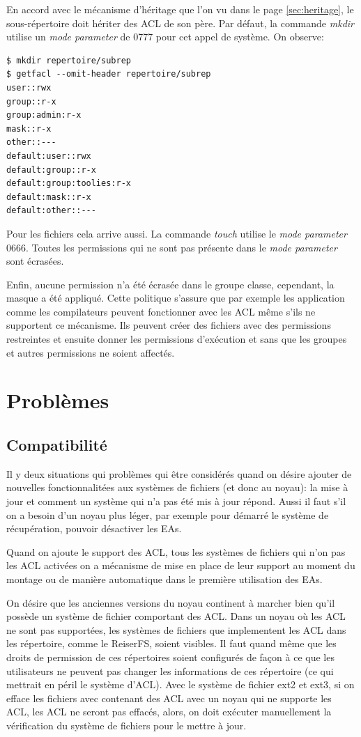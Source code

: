 En accord avec le mécanisme d'héritage que l'on vu dans le page \ref{sec:heritage}, le sous-répertoire doit hériter des ACL de son père. Par défaut, la commande \emph{mkdir} utilise un \emph{mode parameter} de 0777 pour cet appel de système. On observe:

\begin{verbatim}
$ mkdir repertoire/subrep 
$ getfacl --omit-header repertoire/subrep 
user::rwx 
group::r-x 
group:admin:r-x 
mask::r-x 
other::--- 
default:user::rwx 
default:group::r-x 
default:group:toolies:r-x 
default:mask::r-x 
default:other::---
\end{verbatim}

Pour les fichiers cela arrive aussi. La commande \emph{touch} utilise le \emph{mode parameter} 0666. Toutes les permissions qui ne sont pas présente dans le \emph{mode parameter} sont écrasées.

Enfin, aucune permission n'a été écrasée dans le groupe classe, cependant, la masque a été appliqué. Cette politique s'assure que par exemple les application comme les compilateurs peuvent fonctionner avec les ACL même s'ils ne supportent ce mécanisme. Ils peuvent créer des fichiers avec des permissions restreintes et ensuite donner les permissions d'exécution et sans que les groupes et autres permissions ne soient affectés.


\section*{Problèmes}

\subsection*{Compatibilité}

Il y deux situations qui problèmes qui être considérés quand on désire ajouter de nouvelles fonctionnalitées aux systèmes de fichiers (et donc au noyau): la mise à jour et comment un système qui n'a pas été mis à jour répond.
Aussi il faut s'il on a besoin d'un noyau plus léger, par exemple pour démarré le système de récupération, pouvoir désactiver les EAs. 

Quand on ajoute le support des ACL, tous les systèmes de fichiers qui n'on pas les ACL activées on a mécanisme de mise en place de leur support au moment du montage ou de manière automatique dans le première utilisation des EAs. 

On désire que les anciennes versions du noyau continent à marcher bien qu'il possède un système de fichier comportant des ACL. Dans un noyau où les ACL ne sont pas supportées, les systèmes de fichiers que implementent les ACL dans les répertoire, comme le ReiserFS, soient visibles. Il faut quand même que les droits de permission de ces répertoires soient configurés de façon à ce que les utilisateurs ne peuvent pas changer les informations de ces répertoire (ce qui mettrait en péril le système d'ACL). Avec le système de fichier ext2 et ext3, si on efface les fichiers avec contenant des ACL avec un noyau qui ne supporte les ACL, les ACL ne seront pas effacés, alors, on doit exécuter manuellement la vérification du système de fichiers pour le mettre à jour. 
 	
